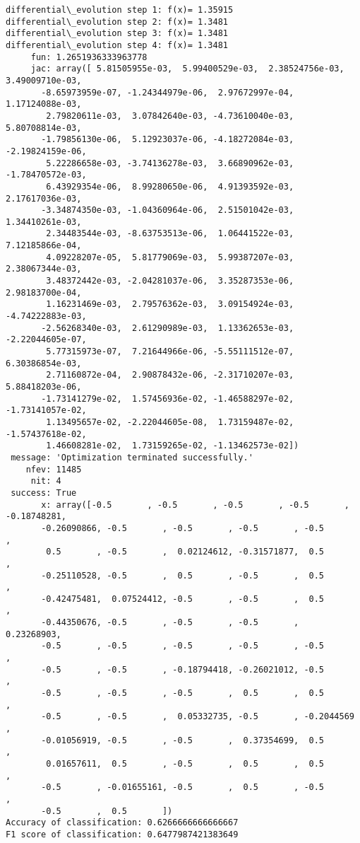 \documentclass[11pt]{article}
\begin{document}
    \begin{Verbatim}[commandchars=\\\{\}]
differential\_evolution step 1: f(x)= 1.35915
differential\_evolution step 2: f(x)= 1.3481
differential\_evolution step 3: f(x)= 1.3481
differential\_evolution step 4: f(x)= 1.3481
     fun: 1.2651936333963778
     jac: array([ 5.81505955e-03,  5.99400529e-03,  2.38524756e-03,  3.49009710e-03,
       -8.65973959e-07, -1.24344979e-06,  2.97672997e-04,  1.17124088e-03,
        2.79820611e-03,  3.07842640e-03, -4.73610040e-03,  5.80708814e-03,
       -1.79856130e-06,  5.12923037e-06, -4.18272084e-03, -2.19824159e-06,
        5.22286658e-03, -3.74136278e-03,  3.66890962e-03, -1.78470572e-03,
        6.43929354e-06,  8.99280650e-06,  4.91393592e-03,  2.17617036e-03,
       -3.34874350e-03, -1.04360964e-06,  2.51501042e-03,  1.34410261e-03,
        2.34483544e-03, -8.63753513e-06,  1.06441522e-03,  7.12185866e-04,
        4.09228207e-05,  5.81779069e-03,  5.99387207e-03,  2.38067344e-03,
        3.48372442e-03, -2.04281037e-06,  3.35287353e-06,  2.98183700e-04,
        1.16231469e-03,  2.79576362e-03,  3.09154924e-03, -4.74222883e-03,
       -2.56268340e-03,  2.61290989e-03,  1.13362653e-03, -2.22044605e-07,
        5.77315973e-07,  7.21644966e-06, -5.55111512e-07,  6.30386854e-03,
        2.71160872e-04,  2.90878432e-06, -2.31710207e-03,  5.88418203e-06,
       -1.73141279e-02,  1.57456936e-02, -1.46588297e-02, -1.73141057e-02,
        1.13495657e-02, -2.22044605e-08,  1.73159487e-02, -1.57437618e-02,
        1.46608281e-02,  1.73159265e-02, -1.13462573e-02])
 message: 'Optimization terminated successfully.'
    nfev: 11485
     nit: 4
 success: True
       x: array([-0.5       , -0.5       , -0.5       , -0.5       , -0.18748281,
       -0.26090866, -0.5       , -0.5       , -0.5       , -0.5       ,
        0.5       , -0.5       ,  0.02124612, -0.31571877,  0.5       ,
       -0.25110528, -0.5       ,  0.5       , -0.5       ,  0.5       ,
       -0.42475481,  0.07524412, -0.5       , -0.5       ,  0.5       ,
       -0.44350676, -0.5       , -0.5       , -0.5       ,  0.23268903,
       -0.5       , -0.5       , -0.5       , -0.5       , -0.5       ,
       -0.5       , -0.5       , -0.18794418, -0.26021012, -0.5       ,
       -0.5       , -0.5       , -0.5       ,  0.5       ,  0.5       ,
       -0.5       , -0.5       ,  0.05332735, -0.5       , -0.2044569 ,
       -0.01056919, -0.5       , -0.5       ,  0.37354699,  0.5       ,
        0.01657611,  0.5       , -0.5       ,  0.5       ,  0.5       ,
       -0.5       , -0.01655161, -0.5       ,  0.5       , -0.5       ,
       -0.5       ,  0.5       ])
Accuracy of classification: 0.6266666666666667
F1 score of classification: 0.6477987421383649

    \end{Verbatim}
\end{document}

